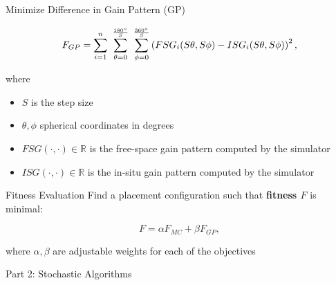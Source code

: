 \documentclass{beamer}
\begin{document}
\begin{frame}{Minimize Difference in Gain Pattern (GP)}
    \begin{tcolorbox}[colback=green!5]
        \begin{equation} \label{eq:rp}
            F_{GP} = \sum_{i=1}^n~\sum_{\theta=0}^{\frac{180\degree}{S}}~\sum_{\phi=0}^{\frac{360\degree}{S}}
            \left( FSG_i(S\theta,S\phi) - ISG_i(S\theta,S\phi) \right) ^2,
        \end{equation}
    \end{tcolorbox}
    where
    \begin{itemize}
            \small
        \item $S$ is the step size
        \item $\theta, \phi$ spherical coordinates in degrees
        \item $FSG(\cdot,\cdot) \in \mathbb R$ is the free-space gain pattern computed by the simulator
        \item $ISG(\cdot,\cdot) \in \mathbb R$ is the in-situ gain pattern computed by the simulator
    \end{itemize}
\end{frame}

\begin{frame}{Fitness Evaluation}
    Find a placement configuration such that \textbf{fitness $F$} is minimal:
    \vspace*{.5cm}
    \begin{tcolorbox}[colback=green!5]
        \begin{equation} \label{eq:optimal}
            F = \alpha F_{MC} + \beta F_{GP},
        \end{equation}
    \end{tcolorbox}
    where $\alpha, \beta$ are adjustable weights for each of the objectives 
\end{frame}

\begin{frame}{\null}
    \begin{tcolorbox}[colback=green!5]
        \centering\Huge
        Part 2: Stochastic Algorithms
    \end{tcolorbox}
\end{frame}
\end{document}
